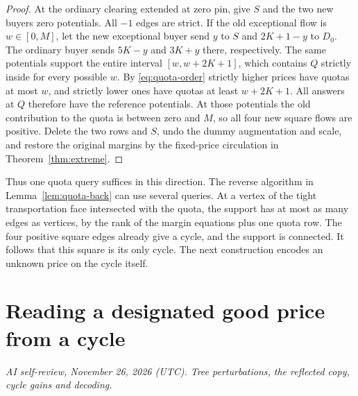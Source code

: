 \documentclass[11pt,oneside,openany,notitlepage]{report}
\newcommand{\reviewdate}{November 26, 2026 (UTC)}
\newcommand{\reviewmark}[1]{\par\nopagebreak[4]\noindent
  {\footnotesize\itshape AI self-review, \reviewdate. #1\par}\nobreak\smallskip}
\begin{document}
\begin{proof}
At the ordinary clearing extended at zero pin, give \(S\) and the
two new buyers zero potentials. All \(-1\) edges are strict. If the old
exceptional flow is \(w\in[0,M]\), let the new exceptional buyer send
\(y\) to \(S\) and \(2K+1-y\) to \(D_0\). The ordinary buyer sends
\(5K-y\) and \(3K+y\) there, respectively. The same potentials support
the entire interval \([w,w+2K+1]\), which contains \(Q\) strictly
inside for every possible \(w\). By \eqref{eq:quota-order} strictly
higher prices have quotas at most \(w\), and strictly lower ones have
quotas at least \(w+2K+1\). All answers at \(Q\) therefore have the
reference potentials. At those potentials the old contribution to the
quota is between zero and \(M\), so all four new square flows are positive.
Delete the two rows and \(S\), undo the dummy augmentation and scale, and
restore the original margins by the fixed-price circulation in
Theorem~\ref{thm:extreme}.
\end{proof}

Thus one quota query suffices in this direction. The reverse algorithm
in Lemma~\ref{lem:quota-back} can use several queries. At a vertex of the
tight transportation face intersected with the quota, the support has
at most as many edges as vertices, by the rank of the margin equations
plus one quota row. The four positive square edges already give a cycle,
and the support is connected. It follows that this square is its only
cycle. The next construction encodes an unknown price on the cycle itself.

\section{Reading a designated good price from a cycle}
\reviewmark{Tree perturbations, the reflected copy, cycle gains and decoding.}
\end{document}

